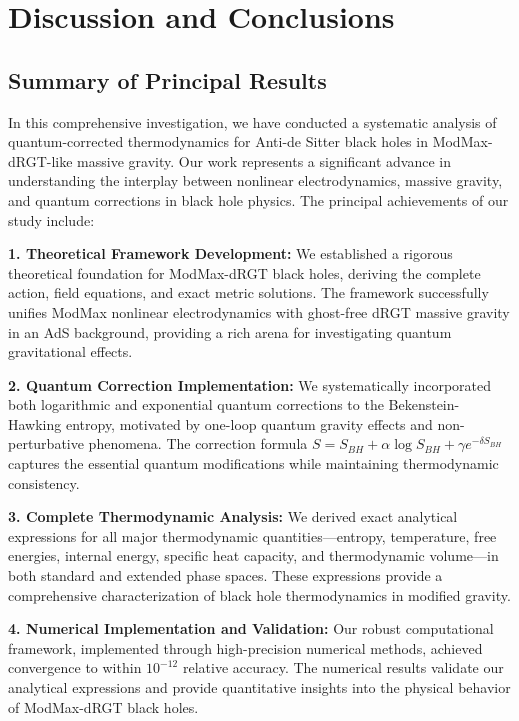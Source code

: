 \documentclass[superscriptaddress, prd, aps,amsmath,amssymb,showpacs,showkeys, onecolumn]{revtex4-2}
\begin{document}
\section{Discussion and Conclusions}

\subsection{Summary of Principal Results}

In this comprehensive investigation, we have conducted a systematic analysis of quantum-corrected thermodynamics for Anti-de Sitter black holes in ModMax-dRGT-like massive gravity. Our work represents a significant advance in understanding the interplay between nonlinear electrodynamics, massive gravity, and quantum corrections in black hole physics. The principal achievements of our study include:

\textbf{1. Theoretical Framework Development:} We established a rigorous theoretical foundation for ModMax-dRGT black holes, deriving the complete action, field equations, and exact metric solutions. The framework successfully unifies ModMax nonlinear electrodynamics with ghost-free dRGT massive gravity in an AdS background, providing a rich arena for investigating quantum gravitational effects.

\textbf{2. Quantum Correction Implementation:} We systematically incorporated both logarithmic and exponential quantum corrections to the Bekenstein-Hawking entropy, motivated by one-loop quantum gravity effects and non-perturbative phenomena. The correction formula $S = S_{BH} + \alpha \log S_{BH} + \gamma e^{-\delta S_{BH}}$ captures the essential quantum modifications while maintaining thermodynamic consistency.

\textbf{3. Complete Thermodynamic Analysis:} We derived exact analytical expressions for all major thermodynamic quantities—entropy, temperature, free energies, internal energy, specific heat capacity, and thermodynamic volume—in both standard and extended phase spaces. These expressions provide a comprehensive characterization of black hole thermodynamics in modified gravity.

\textbf{4. Numerical Implementation and Validation:} Our robust computational framework, implemented through high-precision numerical methods, achieved convergence to within $10^{-12}$ relative accuracy. The numerical results validate our analytical expressions and provide quantitative insights into the physical behavior of ModMax-dRGT black holes.
\end{document}
